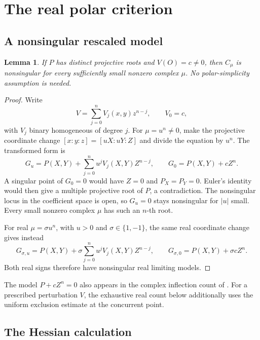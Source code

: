 \documentclass[11pt,a4paper]{article}
\newtheorem{lemma}[theorem]{Lemma}
\theoremstyle{remark}
\begin{document}
\section{The real polar criterion}

\subsection{A nonsingular rescaled model}

\begin{lemma}\label{lem:smooth}
If \(P\) has distinct projective roots and \(V(O)=c\ne0\), then
\(C_\mu\) is nonsingular for every sufficiently small nonzero
complex \(\mu\). No polar-simplicity assumption is needed.
\end{lemma}

\begin{proof}
Write
\[
 V=\sum_{j=0}^n V_j(x,y)z^{n-j},\qquad V_0=c,
\]
with \(V_j\) binary homogeneous of degree \(j\).
For \(\mu=u^n\ne0\), make the projective coordinate change
\([x:y:z]=[uX:uY:Z]\) and divide the equation by \(u^n\).
The transformed form is
\[
 G_u=P(X,Y)+\sum_{j=0}^n u^jV_j(X,Y)Z^{n-j},
 \qquad G_0=P(X,Y)+cZ^n.
\]
A singular point of \(G_0=0\) would have \(Z=0\) and
\(P_X=P_Y=0\). Euler's identity would then give a multiple
projective root of \(P\), a contradiction. The nonsingular locus
in the coefficient space is open, so \(G_u=0\) stays nonsingular
for \(|u|\) small. Every small nonzero complex \(\mu\) has such
an \(n\)-th root.

For real \(\mu=\sigma u^n\), with \(u>0\) and
\(\sigma\in\{1,-1\}\), the same real coordinate change gives instead
\begin{equation}\label{eq:realmodel}
 G_{\sigma,u}
 =P(X,Y)+\sigma\sum_{j=0}^n u^jV_j(X,Y)Z^{n-j},
 \qquad G_{\sigma,0}=P(X,Y)+\sigma cZ^n.
\end{equation}
Both real signs therefore have nonsingular real limiting models.
\end{proof}

The model \(P+cZ^n=0\) also appears in the complex inflection count of
\citet[proof of Theorem~6.8, author-hosted version]{breidingkohnsturmfels}.
For a prescribed perturbation \(V\), the exhaustive real count below
additionally uses the uniform exclusion estimate at the concurrent point.

\subsection{The Hessian calculation}
\end{document}
